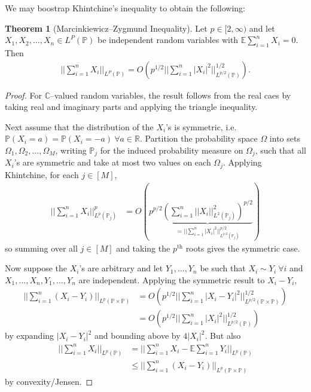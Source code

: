 \documentclass{article}
\theoremstyle{definition}
\newtheorem{theorem}{Theorem}[section]
\begin{document}
We may boostrap Khintchine's inequality to obtain the following:
\begin{theorem}[Marcinkiewicz--Zygmund Inequality]
    Let $p \in [2,\infty)$ and let $X_1,X_2,\ldots,X_n \in L^P(\mathbb{P})$ be independent random variables with $\mathbb{E}\sum_{i=1}^{n} X_i = 0$. Then 
    \begin{align*}
        ||\sum_{i=1}^{n} X_i||_{L^P(\mathbb{P})} = O \left(p^{1/2}||\sum_{i=1}^{n} \left|X_i\right|^2||_{L^{p/2}(\mathbb{P})}^{1/2}\right).
    \end{align*}
\end{theorem}
\begin{proof}
    For $\mathbb{C}$--valued random variables, the result follows from the real caes by taking real and imaginary parts and applying the triangle inequality. 
    \vspace{1mm}
     
    Next assume that the distribution of the $X_i$'s is symmetric, i.e. $\mathbb{P}\left(X_i=a\right)=\mathbb{P}\left(X_i=-a\right) ~\forall a \in \mathbb{R}$. Partition the probability space $\Omega$ into sets $\Omega_1,\Omega_2,\ldots,\Omega_M$, writing $\mathbb{P}_j$ for the induced probability measure on $\Omega_j$, such that all $X_i$'s are symmetric and take at most two values on each $\Omega_j$. Applying Khintchine, for each $j \in [M]$, 
    \begin{align*}
        ||\sum_{i=1}^{n} X_i||_{L^p(\mathbb{P}_j)}^{p} &= O (p^{p/2} \underbrace{\left(\sum_{i=1}^{n} ||X_i||^2_{L^2(\mathbb{P}_j)}\right)^{p/2}}_{= ||\sum_{i=1}^{n} \left|X_i\right|^2 ||_{L^{p/2}(\mathbb{P}_j)}^{p/2}})
    \end{align*}
    so summing over all $j \in [M]$ and taking the $p^{\text{th}}$ roots gives the symmetric case.

    \vspace{1mm}
     
    Now suppose the $X_i$'s are arbitrary and let $Y_1,\ldots,Y_n$ be such that $X_i \sim Y_i ~\forall i$ and $X_1,\ldots,X_n,Y_1,\ldots,Y_n$ are independent. Applying the symmetric result to $X_i-Y_i$,
    \begin{align*}
        ||\sum_{i=1}^{n} (X_i-Y_i)||_{L^p(\mathbb{P} \times \mathbb{P})} &= O \left(p^{1/2} ||\sum_{i=1}^{n} \left|X_i-Y_i\right|^2||_{L^{p/2}(\mathbb{P} \times \mathbb{P})}^{1/2}\right) \\
        &= O \left(p^{1/2} ||\sum_{i=1}^{n} \left|X_i\right|^2||_{L^{p/2}(\mathbb{P})}^{1/2} \right)
    \end{align*}
    by expanding $\left|X_i-Y_i\right|^2$ and bounding above by $4\left|X_i\right|^2$. But also 
    \begin{align*}
        ||\sum_{i=1}^{n} X_i||_{L^p(\mathbb{P})} &= ||\sum_{i=1}^{n} X_i - \mathbb{E} \sum_{i=1}^{n} Y_i||_{L^p(\mathbb{P})} \\
        &\le ||\sum_{i=1}^{n} (X_i-Y_i)||_{L^p(\mathbb{P} \times \mathbb{P})}
    \end{align*}
    by convexity/Jensen.
\end{proof}
\end{document}
